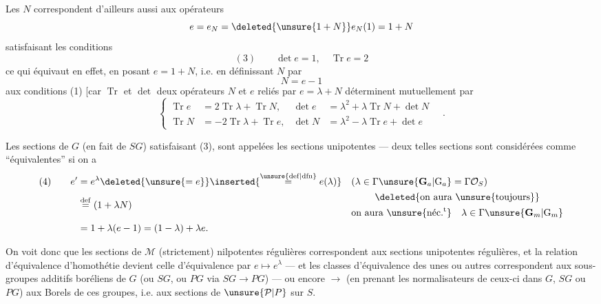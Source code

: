 Les $N$ correspondent d'ailleurs aussi aux opérateurs
\[
e=e_N=\deleted{\unsure{1+N}}e_N(1)=1+N
\]
satisfaisant les conditions
\[
(3)\qquad\det e=1,\quad\operatorname{Tr}e=2
\]
ce qui équivaut en effet, en posant $e=1+N$, i.e. en définissant $N$ par
\[
N=e-1
\]
aux conditions (1) [car $\operatorname{Tr}$ et $\det$  deux opérateurs $N$ et $e$ reliés par $e=\lambda+N$  déterminent mutuellement par
\[
\left\{
\begin{aligned}
\operatorname{Tr}e&=2\operatorname{Tr}\lambda+\operatorname{Tr}N,&
\det e&=\lambda^2+\lambda\operatorname{Tr}N+\det N\\
\operatorname{Tr}N&=-2\operatorname{Tr}\lambda+\operatorname{Tr}e,&
\det N&=\lambda^2-\lambda\operatorname{Tr}e+\det e
\end{aligned}
\right.
\quad .
\]



Les  sections de $G$ (en fait de $SG$) satisfaisant (3),  sont appelées les sections  unipotentes  --- deux telles sections  sont considérées comme ``équivalentes'' si on a
\[
\begin{aligned}
(4)\qquad e'&=e^\lambda\deleted{\unsure{=e}}\inserted{\overset{\unsure{\mathrm{def}|\mathrm{dfn}}}{=}e(\lambda)}
&& (\lambda\in\Gamma\unsure{\mathbf G_a|\mathrm G_a}=\Gamma\mathcal O_S)\\
&\overset{\mathrm{def}}{=}(1+\lambda N)
&&\begin{gathered}\deleted{\text{on aura }\unsure{\text{toujours}}}\\\text{on aura }\unsure{\text{néc.}^{\mathrm t}}\quad\lambda\in\Gamma\unsure{\mathbf G_m|\mathrm G_m}\end{gathered}\\
&=1+\lambda(e-1)=(1-\lambda)+\lambda e.
\end{aligned}
\]

On voit donc que les sections de $\mathcal M$ (strictement) nilpotentes régulières correspondent  aux sections unipotentes régulières, et la relation d'équivalence d'homothétie devient celle d'équivalence par $e\longmapsto e^\lambda$ --- et les classes d'équivalence des unes ou autres correspondent aux sous-groupes additifs boréliens de $G$ (ou $SG$, ou $PG$ via $SG\longrightarrow PG$) --- ou encore $\longrightarrow$ (en prenant les normalisateurs de ceux-ci dans $G$, $SG$ ou $PG$) aux Borels de ces groupes, i.e. aux sections de $\unsure{\mathcal P|P}$ sur $S$.

